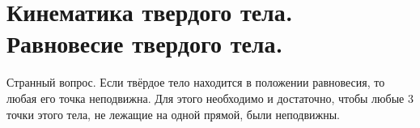 \chapter{Кинематика твердого тела. Равновесие твердого тела.}

Странный вопрос. Если твёрдое тело находится в положении равновесия, то любая
его точка неподвижна. Для этого необходимо и достаточно, чтобы любые 3 точки
этого тела, не лежащие на одной прямой, были неподвижны.

\newpage

